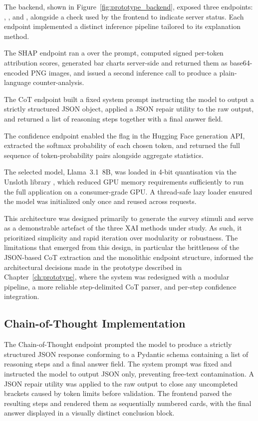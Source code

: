 The backend, shown in Figure~\ref{fig:prototype_backend}, exposed three  endpoints: , , and , alongside a  check used by the frontend to indicate server status. Each endpoint implemented a distinct inference pipeline tailored to its explanation method. 

The SHAP endpoint ran a  over the prompt, computed signed per-token attribution scores, generated  bar charts server-side and returned them as base64-encoded PNG images, and issued a second inference call to produce a plain-language counter-analysis. 

The CoT endpoint built a fixed system prompt instructing the model to output a strictly structured JSON object, applied a JSON repair utility to the raw output, and returned a list of reasoning steps together with a final answer field. 

The confidence endpoint enabled the  flag in the Hugging Face generation API, extracted the softmax probability of each chosen token, and returned the full sequence of token-probability pairs alongside aggregate statistics.

The selected model, Llama~3.1~8B, was loaded in 4-bit quantisation via the Unsloth library \cite{noauthor_llama_nodate}, which reduced GPU memory requirements sufficiently to run the full application on a consumer-grade GPU. A thread-safe lazy loader ensured the model was initialized only once and reused across requests.

This architecture was designed primarily to generate the survey stimuli and serve as a demonstrable artefact of the three XAI methods under study. As such, it prioritized simplicity and rapid iteration over modularity or robustness. The limitations that emerged from this design, in particular the brittleness of the JSON-based CoT extraction and the monolithic endpoint structure, informed the architectural decisions made in the prototype described in Chapter~\ref{ch:prototype}, where the system was redesigned with a modular pipeline, a more reliable step-delimited CoT parser, and per-step confidence integration.

\subsection{Chain-of-Thought Implementation}
\label{sec:cot}

The Chain-of-Thought endpoint prompted the model to produce a strictly structured JSON response conforming to a Pydantic schema containing a list of reasoning steps and a final answer field. The system prompt was fixed and instructed the model to output JSON only, preventing free-text contamination. A JSON repair utility was applied to the raw output to close any uncompleted brackets caused by token limits before validation. The frontend parsed the resulting steps and rendered them as sequentially numbered cards, with the final answer displayed in a visually distinct conclusion block.

